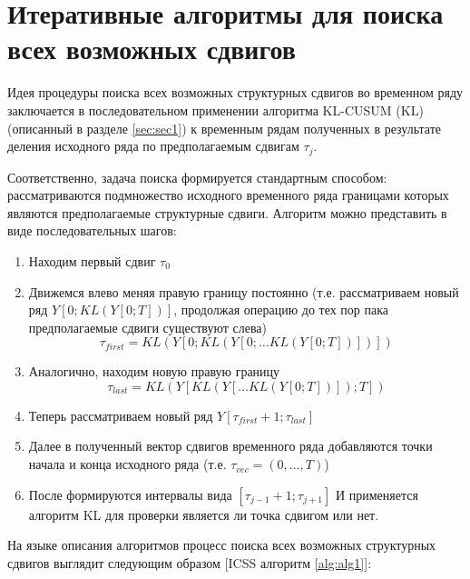 \documentclass[a4paper,14pt,russian]{extarticle}
\begin{document}
	\section{\label{sec:sec2}Итеративные алгоритмы для поиска всех возможных сдвигов}
	Идея процедуры поиска всех возможных структурных сдвигов во временном ряду заключается в последовательном применении алгоритма KL-CUSUM (KL) (описанный в разделе \ref{sec:sec1}) к временным рядам полученных в результате деления исходного ряда по предполагаемым сдвигам $\tau_j$.
	\par
	Соответственно, задача поиска формируется стандартным способом: рассматриваются подмножество исходного временного ряда границами которых являются предполагаемые структурные сдвиги. Алгоритм можно представить в виде последовательных шагов:
	\begin{enumerate}
		\item Находим первый сдвиг $\tau_0$ 
		\item Движемся влево меняя правую границу постоянно (т.е. рассматриваем новый ряд $Y\left[0; KL(Y\left[0; T\right])\right]$, продолжая операцию до тех пор пака предполагаемые сдвиги существуют слева)
		\begin{equation}
			\tau_{first} = KL(Y\left[0; KL(Y\left[0; \dots KL(Y\left[0; T\right]) \right] )   \right])
		\end{equation}
		\item Аналогично, находим новую правую границу
			\begin{equation}
				\tau_{last} = KL(Y\left[KL(Y\left[ \dots KL(Y\left[0; T\right])\right]); T\right])
			\end{equation}
		\item Теперь рассматриваем новый ряд $Y\left[\tau_{first} + 1; \tau_{last}\right]$
		\item Далее в полученный вектор сдвигов временного ряда добавляются точки начала и конца исходного ряда (т.е. $\tau_{vec} = \left( 0, \dots, T \right)$)
		\item После формируются интервалы вида $\left[ \tau_{j - 1} + 1; \tau_{j + 1} \right]$ И применяется алгоритм KL для проверки является ли точка сдвигом или нет.
	\end{enumerate}
	\par
	На языке описания алгоритмов процесс поиска всех возможных структурных сдвигов выглядит следующим образом [ICSS алгоритм \ref{alg:alg1}]:
\end{document}
